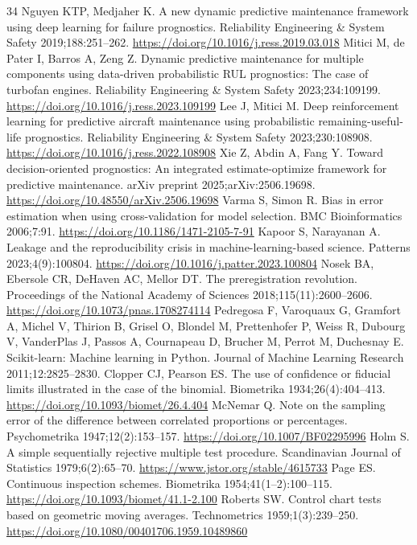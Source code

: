 \documentclass[a4paper,fleqn,doubleblind]{cas-dc}
\begin{document}
\begin{thebibliography}{34}
 Nguyen KTP, Medjaher K. A new dynamic predictive maintenance framework using deep learning for failure prognostics. Reliability Engineering \& System Safety 2019;188:251--262. \url{https://doi.org/10.1016/j.ress.2019.03.018}
 Mitici M, de Pater I, Barros A, Zeng Z. Dynamic predictive maintenance for multiple components using data-driven probabilistic RUL prognostics: The case of turbofan engines. Reliability Engineering \& System Safety 2023;234:109199. \url{https://doi.org/10.1016/j.ress.2023.109199}
 Lee J, Mitici M. Deep reinforcement learning for predictive aircraft maintenance using probabilistic remaining-useful-life prognostics. Reliability Engineering \& System Safety 2023;230:108908. \url{https://doi.org/10.1016/j.ress.2022.108908}
 Xie Z, Abdin A, Fang Y. Toward decision-oriented prognostics: An integrated estimate-optimize framework for predictive maintenance. arXiv preprint 2025;arXiv:2506.19698. \url{https://doi.org/10.48550/arXiv.2506.19698}
 Varma S, Simon R. Bias in error estimation when using cross-validation for model selection. BMC Bioinformatics 2006;7:91. \url{https://doi.org/10.1186/1471-2105-7-91}
 Kapoor S, Narayanan A. Leakage and the reproducibility crisis in machine-learning-based science. Patterns 2023;4(9):100804. \url{https://doi.org/10.1016/j.patter.2023.100804}
 Nosek BA, Ebersole CR, DeHaven AC, Mellor DT. The preregistration revolution. Proceedings of the National Academy of Sciences 2018;115(11):2600--2606. \url{https://doi.org/10.1073/pnas.1708274114}
 Pedregosa F, Varoquaux G, Gramfort A, Michel V, Thirion B, Grisel O, Blondel M, Prettenhofer P, Weiss R, Dubourg V, VanderPlas J, Passos A, Cournapeau D, Brucher M, Perrot M, Duchesnay E. Scikit-learn: Machine learning in Python. Journal of Machine Learning Research 2011;12:2825--2830.
 Clopper CJ, Pearson ES. The use of confidence or fiducial limits illustrated in the case of the binomial. Biometrika 1934;26(4):404--413. \url{https://doi.org/10.1093/biomet/26.4.404}
 McNemar Q. Note on the sampling error of the difference between correlated proportions or percentages. Psychometrika 1947;12(2):153--157. \url{https://doi.org/10.1007/BF02295996}
 Holm S. A simple sequentially rejective multiple test procedure. Scandinavian Journal of Statistics 1979;6(2):65--70. \url{https://www.jstor.org/stable/4615733}
 Page ES. Continuous inspection schemes. Biometrika 1954;41(1--2):100--115. \url{https://doi.org/10.1093/biomet/41.1-2.100}
 Roberts SW. Control chart tests based on geometric moving averages. Technometrics 1959;1(3):239--250. \url{https://doi.org/10.1080/00401706.1959.10489860}
\end{thebibliography}
\end{document}
